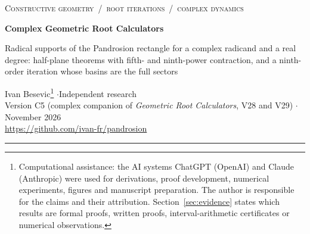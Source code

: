 \documentclass[10pt,a4paper]{article}
\theoremstyle{plain}
\theoremstyle{remark}
\numberwithin{equation}{section}
\begin{document}
{\small\scshape Constructive geometry \,/\, root iterations \,/\, complex dynamics}

\vspace{6pt}
{\LARGE\bfseries Complex Geometric Root Calculators\par}
\vspace{3pt}
{\large Radical supports of the Pandrosion rectangle for a complex radicand and a real degree:
half-plane theorems with fifth- and ninth-power contraction, and a ninth-order iteration whose basins
are the full sectors\par}
\vspace{8pt}
Ivan Besevic\footnote{Computational assistance: the AI systems ChatGPT (OpenAI) and Claude (Anthropic) were used for derivations, proof development,
numerical experiments, figures and manuscript preparation. The author is responsible for the claims
and their attribution. Section~\ref{sec:evidence} states which results are formal proofs, written
proofs, interval-arithmetic certificates or numerical observations.}
\quad$\cdot$\quad Independent research\\
Version C5 (complex companion of \emph{Geometric Root Calculators}, V28 and V29) \quad$\cdot$ November 2026\\
\url{https://github.com/ivan-fr/pandrosion}

\vspace{6pt}\hrule\vspace{8pt}
\end{document}
